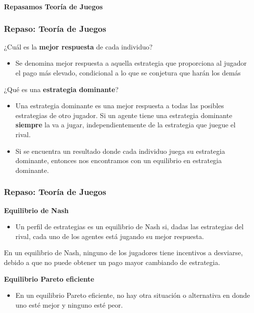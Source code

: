 \documentclass{beamer}
\begin{document}
\begin{frame}
    \centering
    \begin{boxB}
    \centering \Large \textbf{Repasamos Teoría de Juegos} \\   
    \end{boxB}
\end{frame}

\begin{frame}
\frametitle{Repaso: Teoría de Juegos}
    ¿Cuál es la \textbf{mejor respuesta} de cada individuo?
    \begin{itemize}
        \item  Se denomina mejor respuesta a aquella estrategia que proporciona al jugador el pago más elevado, condicional a lo que se conjetura que harán los demás
    \end{itemize}
    \vspace{2mm}
    ¿Qué es una \textbf{estrategia dominante}?
    \begin{itemize}
        \item  Una estrategia dominante es una mejor respuesta a todas las posibles estrategias de otro jugador. Si un agente tiene una estrategia dominante \textbf{siempre} la va a jugar, independientemente de la estrategia que juegue el rival.
        \item Si se encuentra un resultado donde cada individuo juega su estrategia dominante, entonces nos encontramos con un equilibrio en estrategia dominante.
        \end{itemize}
\end{frame}

\begin{frame}
\frametitle{Repaso: Teoría de Juegos}
\textbf{Equilibrio de Nash}
    \begin{itemize}
        \item  Un perfil de estrategias es un equilibrio de Nash si, dadas las estrategias del rival, cada uno de los agentes está jugando su mejor respuesta.
    \end{itemize}
    \begin{boxB}
        \centering
        En un equilibrio de Nash, ninguno de los jugadores tiene incentivos a desviarse, debido a que no puede obtener un pago mayor cambiando de estrategia.
    \end{boxB}
   \textbf{ Equilibrio Pareto eficiente}
        \begin{itemize}
        \item   En un equilibrio Pareto eficiente, no hay otra situación o alternativa en donde uno esté mejor y ninguno esté peor. 
    \end{itemize}

\end{frame}
\end{document}
